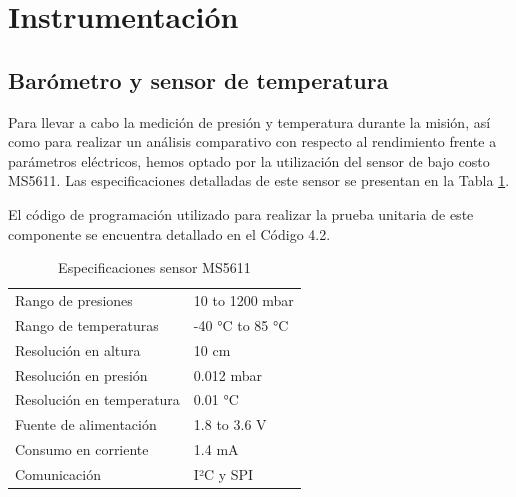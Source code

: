 \newpage


\section{Instrumentación}

\subsection{Barómetro y sensor de temperatura}

Para llevar a cabo la medición de presión y temperatura durante la misión, así como para realizar un análisis comparativo con respecto al rendimiento frente a parámetros eléctricos, hemos optado por la utilización del sensor de bajo costo MS5611. Las especificaciones detalladas de este sensor se presentan en la Tabla \ref{tab:ms5611}.

El código de programación utilizado para realizar la prueba unitaria de este componente se encuentra detallado en el Código 4.2.


\begin{table}[h]
\centering
\caption{Especificaciones sensor MS5611}
\label{tab:ms5611}
\begin{tabular}{ll}
\toprule
Rango de presiones & 10 to 1200 mbar \\
Rango de temperaturas & -40 °C to 85 °C \\
Resolución en altura & 10 cm \\
Resolución en presión & 0.012 mbar \\
Resolución en temperatura & 0.01 °C \\
Fuente de alimentación & 1.8 to 3.6 V \\
Consumo en corriente & 1.4 mA \\
Comunicación & I²C y SPI \\
\bottomrule
\end{tabular}
\end{table}


